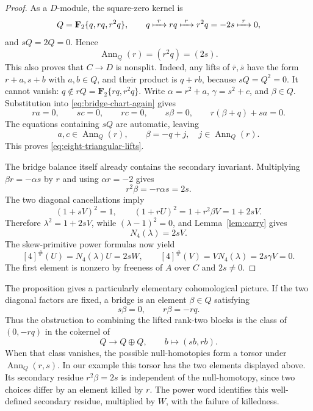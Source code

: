 \documentclass[11pt]{amsart}
\theoremstyle{definition}
\theoremstyle{remark}
\newcommand{\F}{\mathbf F}
\newcommand{\Ann}{\operatorname{Ann}}
\begin{document}
\begin{proof}
As a \(D\)-module, the square-zero kernel is
\begin{equation}\label{eq:Q-module-chain}
 Q=\F_2\{q,rq,r^2q\},
 \qquad
 q\xmapsto{\ r\ }rq
 \xmapsto{\ r\ }r^2q=-2s
 \xmapsto{\ r\ }0,
\end{equation}
and \(sQ=2Q=0\).  Hence
\[
 \Ann_Q(r)=(r^2q)=(2s).
\]
This also proves that \(C\to D\) is nonsplit.  Indeed, any lifts of
\(\overline r,\overline s\) have the form \(r+a,s+b\) with \(a,b\in Q\),
and their product is \(q+rb\), because \(sQ=Q^2=0\).  It cannot vanish:
\(q\notin rQ=\F_2\{rq,r^2q\}\).
Write
\(\alpha=r^2+a\), \(\gamma=s^2+c\), and \(\beta\in Q\).
Substitution into \eqref{eq:bridge-chart-again} gives
\[
 ra=0,\qquad sc=0,\qquad rc=0,\qquad
 s\beta=0,\qquad r(\beta+q)+sa=0.
\]
The equations containing \(sQ\) are automatic, leaving
\[
 a,c\in\Ann_Q(r),
 \qquad
 \beta=-q+j,\quad j\in\Ann_Q(r).
\]
This proves \eqref{eq:eight-triangular-lifts}.

The bridge balance itself already contains the secondary invariant.
Multiplying \(\beta r=-\alpha s\) by \(r\) and using
\(\alpha r=-2\) gives
\begin{equation}\label{eq:secondary-bridge-residue}
 r^2\beta=-r\alpha s=2s.
\end{equation}
The two diagonal cancellations imply
\[
 (1+sV)^2=1,\qquad
 (1+rU)^2=1+r^2\beta V=1+2sV.
\]
Therefore \(\lambda^2=1+2sV\), while
\((\lambda-1)^2=0\), and Lemma~\ref{lem:carry} gives
\[
 N_4(\lambda)=2sV.
\]
The skew-primitive power formulas now yield
\[
 [4]^\#(U)=N_4(\lambda)U=2sW,
 \qquad
 [4]^\#(V)=V N_4(\lambda)=2s\gamma V=0.
\]
The first element is nonzero by freeness of \(A\) over \(C\) and
\(2s\ne0\).
\end{proof}

The proposition gives a particularly elementary cohomological picture.
If the two diagonal factors are fixed, a bridge is an element
\(\beta\in Q\) satisfying
\begin{equation}\label{eq:bridge-nullhomotopy}
 s\beta=0,\qquad r\beta=-rq.
\end{equation}
Thus the obstruction to combining the lifted rank-two blocks is the class
of \((0,-rq)\) in the cokernel of
\[
 Q\longrightarrow Q\oplus Q,\qquad
 b\longmapsto(sb,rb).
\]
When that class vanishes, the possible null-homotopies form a torsor under
\(\Ann_Q(r,s)\).  In our example this torsor has the two elements displayed
above.  Its secondary residue \(r^2\beta=2s\) is independent of the
null-homotopy, since two choices differ by an element killed by \(r\).
The power word identifies this well-defined secondary residue, multiplied
by \(W\), with the failure of killedness.
\end{document}
